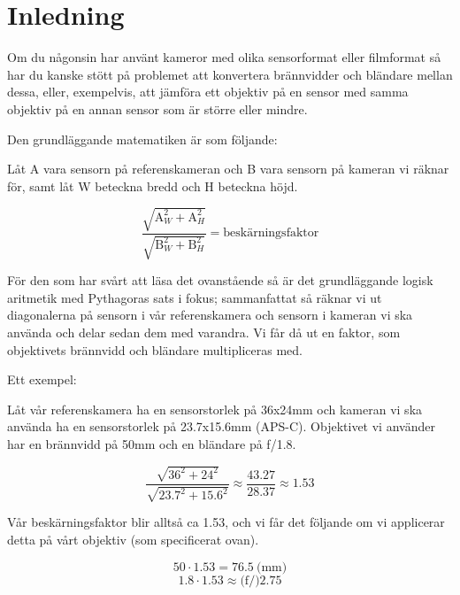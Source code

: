 \documentclass[11pt]{article}
\begin{document}
\clearpage

\renewcommand{\contentsname}{Innehållsförteckning}
\tableofcontents

\clearpage

\section{Inledning}
Om du någonsin har använt kameror med olika sensorformat eller filmformat så
har du kanske stött på problemet att konvertera brännvidder och bländare
mellan dessa, eller, exempelvis, att jämföra ett objektiv på en sensor med
samma objektiv på en annan sensor som är större eller mindre.\par

Den grundläggande matematiken är som följande:\par

Låt A vara sensorn på referenskameran och B vara sensorn på kameran vi
räknar för, samt låt W beteckna bredd och H beteckna höjd.

\[
\frac{ \sqrt{ \text{A}_W^2 + \text{A}_H^2 } }
     { \sqrt{ \text{B}_W^2 + \text{B}_H^2 } }
     = \text{beskärningsfaktor} 
\]

För den som har svårt att läsa det ovanstående så är det grundläggande logisk
aritmetik med Pythagoras sats i fokus; sammanfattat så räknar vi ut diagonalerna
på sensorn i vår referenskamera och sensorn i kameran vi ska använda och delar
sedan dem med varandra. Vi får då ut en faktor, som objektivets brännvidd och
bländare multipliceras med.\par

Ett exempel:\par

Låt vår referenskamera ha en sensorstorlek på 36x24mm och kameran vi
ska använda ha en sensorstorlek på 23.7x15.6mm (APS-C). Objektivet vi använder
har en brännvidd på 50mm och en bländare på f/1.8.

\begin{equation}
\frac{ \sqrt{36^2 + 24^2 } }
     { \sqrt{23.7^2 + 15.6^2 } }
     \approx \frac{43.27}{28.37}
     \approx 1.53
\end{equation}

Vår beskärningsfaktor blir alltså ca 1.53, och vi får det följande om vi
applicerar detta på vårt objektiv (som specificerat ovan).

\begin{equation}
    50 \cdot 1.53 = 76.5 \ \text{(mm)}
\end{equation}
\begin{equation}
    1.8 \cdot 1.53 \approx \text{(f/)} 2.75
\end{equation}
\end{document}
